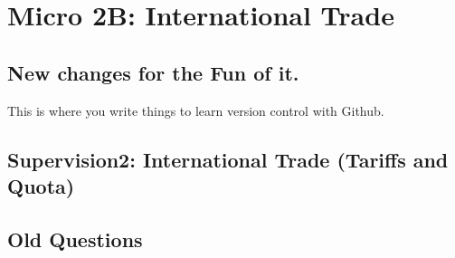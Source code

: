 %
%
%
%
%
%
%
%
%
%
%
%
%
%
%
%
%
%
%
%
%
%
%
%
%
%





 \frontmatter
 \maketitle
 \tableofcontents
 \mainmatter


\part{Micro 2B: International Trade}
%


% 


\chapter*{New changes for the Fun of it.}

This is where you write things to learn version control with Github. 

\chapter*{Supervision2: International Trade (Tariffs and Quota)}





\chapter*{Old Questions}









\newpage

\backmatter
%
%
\printindex




 
 
